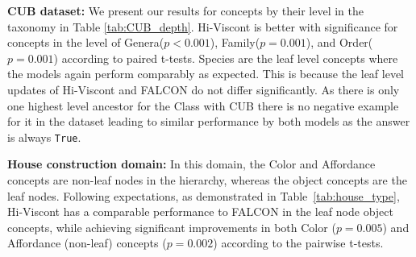 \noindent\textbf{CUB dataset:} 
We present our results for concepts by their level in the taxonomy in Table \ref{tab:CUB_depth}. 
Hi-Viscont is better with significance for concepts in the level of Genera($p<0.001$), Family($p=0.001$), and Order($p=0.001$) according to paired t-tests.
Species are the leaf level concepts where the models again perform comparably as expected. This is because the leaf level updates of Hi-Viscont and FALCON do not differ significantly.
As there is only one highest level ancestor for the Class with CUB there is no negative example for it in the dataset leading to similar performance by both models as the answer is always \texttt{True}.


\begin{table}[]
\caption{The average F1 score and standard deviation of Hi-Viscont and FALCON on the house construction domain by type of concepts.}
\label{tab:house_type}
\end{table}

\noindent\textbf{House construction domain:} 
In this domain, the Color and  Affordance concepts are non-leaf nodes in the hierarchy, whereas the object concepts are the leaf nodes. 
Following expectations, as demonstrated in Table~\ref{tab:house_type}, Hi-Viscont has a comparable performance to FALCON in the leaf node object concepts, while achieving significant improvements in both Color ($p=0.005$) and Affordance (non-leaf) concepts ($p=0.002$) according to the pairwise t-tests.



\begin{table}[b]
\centering
{}
\caption{The average F1 score and standard deviation of Hi-Viscont and FALCON on the zoo domain by type of concepts.}
\label{tab:zoo_type}
\end{table}


